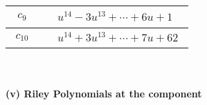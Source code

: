 \documentclass[1p]{elsarticle_modified}
\theoremstyle{definition}
\begin{document}
\begin{tabular}{m{50pt}|m{274pt}}
\hline $$\begin{aligned}c_{9}\end{aligned}$$&$\begin{aligned}
&u^{14}-3 u^{13}+\cdots+6 u+1
\end{aligned}$\\
\hline $$\begin{aligned}c_{10}\end{aligned}$$&$\begin{aligned}
&u^{14}+3 u^{13}+\cdots+7 u+62
\end{aligned}$\\
\hline
\end{tabular}\\~\\
\newpage\renewcommand{\arraystretch}{1}
\flushleft \textbf{(v) Riley Polynomials at the component}\newline \\
\end{document}
